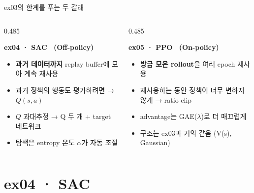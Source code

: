 \documentclass[aspectratio=169,11pt,xcolor=table]{beamer}
\newcommand{\boxtitle}[1]{{\bfseries\color{brand}#1}\par\smallskip}
\begin{document}
\begin{frame}{ex03의 한계를 푸는 두 갈래}
  \begin{columns}[T,onlytextwidth]
    \begin{column}{0.485\textwidth}
      \begin{keybox}[colback=c04!7,colframe=c04!7,height=5.2cm]
        \boxtitle{ex04 · SAC \ {\normalfont\small(Off-policy)}}
        \begin{itemize}\small
          \item \textbf{과거 데이터까지} replay buffer에 모아 계속 재사용
          \item 과거 정책의 행동도 평가하려면 → $Q(s,a)$
          \item $Q$ 과대추정 → Q 두 개 + target 네트워크
          \item 탐색은 entropy 온도 $\alpha$가 자동 조절
        \end{itemize}
      \end{keybox}
    \end{column}
    \begin{column}{0.485\textwidth}
      \begin{keybox}[colback=c05!8,colframe=c05!8,height=5.2cm]
        \boxtitle{ex05 · PPO \ {\normalfont\small(On-policy)}}
        \begin{itemize}\small
          \item \textbf{방금 모은 rollout}을 여러 epoch 재사용
          \item 재사용하는 동안 정책이 너무 변하지 않게 → ratio clip
          \item advantage는 GAE($\lambda$)로 더 매끄럽게
          \item 구조는 ex03과 거의 같음 (V(s), Gaussian)
        \end{itemize}
      \end{keybox}
    \end{column}
  \end{columns}
\end{frame}

\section{ex04 · SAC}
\end{document}
